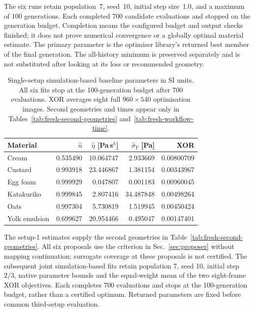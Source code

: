 The six runs retain population~7, seed~10, initial step size~1.0,
and a maximum of 100 generations. Each completed 700 candidate
evaluations and stopped on the generation budget. Completion means
the configured budget and output checks finished; it does not prove
numerical convergence or a globally optimal material estimate.
The primary parameter is the optimiser library's returned best member
of the final generation. The all-history minimum is preserved
separately and is not substituted after looking at its loss or
recommended geometry.

\begin{table}[!htbp]
\centering\small\setlength{\tabcolsep}{5pt}
\caption{Single-setup simulation-based baseline parameters in SI units. All six fits stop at the 100-generation budget after 700 evaluations. XOR averages eight full $960\times540$ optimisation images. Second geometries and times appear only in Tables~\ref{tab:fresh-second-geometries} and~\ref{tab:fresh-workflow-time}.}
\label{tab:freshness-old-setup1}
\begin{tabular}{@{}lrrrr@{}}
\toprule
Material & $\hat n$ & $\hat\eta$ [Pa\,s$^{\hat n}$] & $\hat\sigma_Y$ [Pa] & XOR \\
\midrule
Cream & 0.535490 & 10.064747 & 2.933669 & 0.00800709 \\
Custard & 0.993918 & 23.446867 & 1.381154 & 0.00343967 \\
Egg foam & 0.999929 & 0.047807 & 0.001183 & 0.00960045 \\
Katakuriko & 0.999845 & 2.807416 & 34.487848 & 0.00498264 \\
Oats & 0.997304 & 5.730819 & 1.519945 & 0.00450424 \\
Yolk emulsion & 0.699627 & 20.954466 & 0.495047 & 0.00147401 \\
\bottomrule
\end{tabular}
\end{table}

The setup-1 estimates supply the second geometries in
Table~\ref{tab:fresh-second-geometries}. All six proposals use the
criterion in Sec.~\ref{sec:proposer} without mapping continuation;
surrogate coverage at these proposals is not certified. The subsequent
joint simulation-based fits retain population 7, seed 10, initial
step $2/3$, native parameter bounds and the equal-weight mean of
the two eight-frame XOR objectives. Each completes 700 evaluations
and stops at the 100-generation budget, rather than a certified optimum.
Returned parameters are fixed before common third-setup evaluation.

